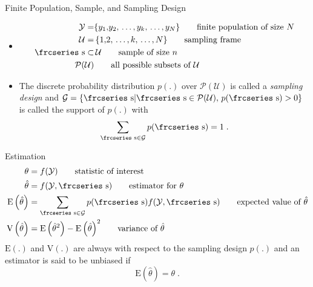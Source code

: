 \documentclass{beamer}\usepackage[]{graphicx}\usepackage[]{color}
\newcommand{\eqname}[1]{\tag*{#1}} %
\newcommand{\textfrc}[1]{{\frcseries#1}}
\newcommand{\mathfrc}[1]{\text{\textfrc{#1}}}
\newcommand{\E}[1]{\text{E}\left(#1\right)}
\newcommand{\V}[1]{\text{V}\left(#1\right)}
\begin{document}
\begin{frame}{\alert{Finite} Population, Sample, and Sampling Design}

 \begin{itemize}
 \item[] 
 \begin{align}
 \mathcal{Y} = & \{ y_1{,}y_2{,}\,\ldots{,}\,y_k{,}\,\ldots{,}\,y_N \} \eqname{finite population of size $N$} \\
 \mathcal{U} = &\, \{ 1{,}2{,}\,\ldots{,}\,k{,}\,\ldots{,}\,N \} \eqname{sampling frame} \\
 \mathfrc{s} \subset &\, \mathcal{U} \eqname{sample of size $n$} \\
 \mathcal{P}(\mathcal{U}) & \eqname{all possible subsets of $\mathcal{U}$}
 \end{align}
 \item[] The discrete probability distribution $p(.)$ over $\mathcal{P}(\mathcal{U})$ is called a \emph{sampling design} and  $\mathcal{G}=\{ \mathfrc{s} | \mathfrc{s} \in \mathcal{P}(\mathcal{U}),\, p(\mathfrc{s}) > 0 \}$ is called the support of $p(.)$ with
$$
\sum_{\mathfrc{s} \in \mathcal{G}} p(\mathfrc{s}) = 1\;.
$$
 \end{itemize}
\end{frame}


\begin{frame}{Estimation}
\begin{align}
 \theta       & = f(\mathcal{Y})  \eqname{statistic of interest} \\
 \hat{\theta} & = f(\mathcal{Y}, \mathfrc{s} )  \eqname{estimator for $\theta$} \\
 \E{\hat{\theta}} & = \sum_{\mathfrc{s} \in \mathcal{G}} p(\mathfrc{s}) f(\mathcal{Y}, \mathfrc{s} )   \eqname{expected value of $\hat{\theta}$} \\
 \V{\hat{\theta}}   & =  \E{\hat{\theta}^2} -  {\E{\hat{\theta}}}^2 \eqname{variance of  $\hat{\theta}$} 
\end{align}
 $\E{.}$ and $\V{.}$ are always with respect to the sampling design $p(.)$ and
 an estimator is said to be unbiased if
 $$ \E{\hat{\theta}} = \theta\;. $$
\end{frame}
\end{document}
